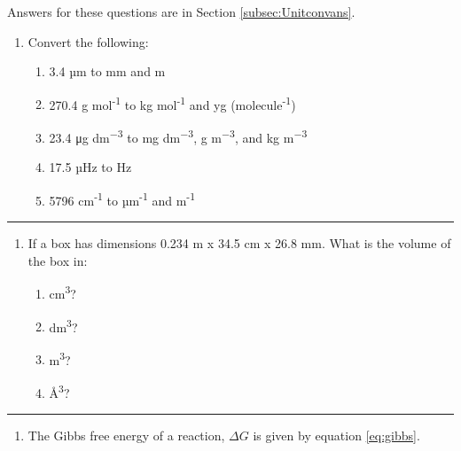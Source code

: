 \documentclass[
]{book}
\providecommand{\tightlist}{%
  \setlength{\itemsep}{0pt}\setlength{\parskip}{0pt}}
\begin{document}
Answers for these questions are in Section \ref{subsec:Unitconvans}.

\begin{enumerate}
\def\labelenumi{\arabic{enumi}.}
\tightlist
\item
  Convert the following:

  \begin{enumerate}
  \def\labelenumii{\alph{enumii}.}
  \tightlist
  \item
    3.4 µm to mm and m
  \item
    270.4 g mol\textsuperscript{-1} to kg mol\textsuperscript{-1} and yg (molecule\textsuperscript{-1})
  \item
    23.4 μg dm\textsuperscript{−3} to mg dm\textsuperscript{−3}, g m\textsuperscript{−3}, and kg m\textsuperscript{−3}
  \item
    17.5 µHz to Hz
  \item
    5796 cm\textsuperscript{-1} to µm\textsuperscript{-1} and m\textsuperscript{-1}
  \end{enumerate}
\end{enumerate}

\begin{center}\rule{0.5\linewidth}{0.5pt}\end{center}

\begin{enumerate}
\def\labelenumi{\arabic{enumi}.}
\setcounter{enumi}{1}
\tightlist
\item
  If a box has dimensions 0.234 m x 34.5 cm x 26.8 mm. What is the volume of the box in:

  \begin{enumerate}
  \def\labelenumii{\alph{enumii}.}
  \tightlist
  \item
    cm\textsuperscript{3}?
  \item
    dm\textsuperscript{3}?
  \item
    m\textsuperscript{3}?
  \item
    Å\textsuperscript{3}?
  \end{enumerate}
\end{enumerate}

\begin{center}\rule{0.5\linewidth}{0.5pt}\end{center}

\begin{enumerate}
\def\labelenumi{\arabic{enumi}.}
\setcounter{enumi}{2}
\tightlist
\item
  The Gibbs free energy of a reaction, \(\Delta G\) is given by equation \eqref{eq:gibbs}.
\end{enumerate}
\end{document}
